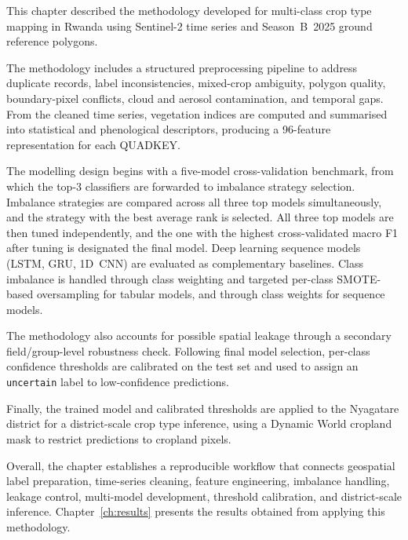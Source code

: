 This chapter described the methodology developed for multi-class crop type
mapping in Rwanda using Sentinel-2 time series and Season~B~2025 ground
reference polygons.

The methodology includes a structured preprocessing pipeline to address
duplicate records, label inconsistencies, mixed-crop ambiguity, polygon
quality, boundary-pixel conflicts, cloud and aerosol contamination, and
temporal gaps. From the cleaned time series, vegetation indices are computed
and summarised into statistical and phenological descriptors, producing a
96-feature representation for each QUADKEY.

The modelling design begins with a five-model cross-validation benchmark,
from which the top-3 classifiers are forwarded to imbalance strategy
selection. Imbalance strategies are compared across all three top models
simultaneously, and the strategy with the best average rank is selected.
All three top models are then tuned independently, and the one with the
highest cross-validated macro F1 after tuning is designated the final
model. Deep learning sequence models (LSTM, GRU, 1D~CNN) are evaluated
as complementary baselines. Class imbalance is handled through class
weighting and targeted per-class SMOTE-based oversampling for tabular
models, and through class weights for sequence models.

The methodology also accounts for possible spatial leakage through a
secondary field/group-level robustness check. Following final model
selection, per-class confidence thresholds are calibrated on the test
set and used to assign an \texttt{uncertain} label to low-confidence
predictions.

Finally, the trained model and calibrated thresholds are applied to the
Nyagatare district for a district-scale crop type inference, using a
Dynamic World cropland mask to restrict predictions to cropland pixels.

Overall, the chapter establishes a reproducible workflow that connects
geospatial label preparation, time-series cleaning, feature engineering,
imbalance handling, leakage control, multi-model development, threshold
calibration, and district-scale inference. Chapter~\ref{ch:results}
presents the results obtained from applying this methodology.
